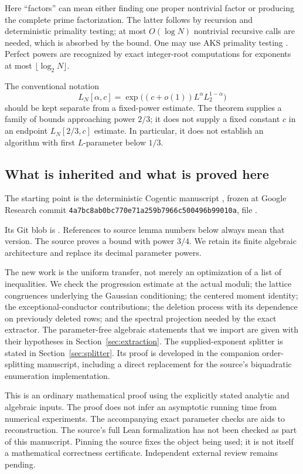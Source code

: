 Here ``factors'' can mean either finding one proper nontrivial factor or
producing the complete prime factorization.  The latter follows by
recursion and deterministic primality testing; at most \(O(\log N)\)
nontrivial recursive calls are needed, which is absorbed by the bound.
One may use AKS primality testing \cite{AKS2004}.  Perfect powers are
recognized by exact integer-root computations for exponents at most
\(\lfloor\log_2N\rfloor\).

The conventional notation
\[
 L_N[\alpha,c]=
 \exp\bigl((c+o(1))L^\alpha L_2^{1-\alpha}\bigr)
\]
should be kept separate from a fixed-power estimate.  The theorem supplies
a family of bounds approaching power \(2/3\); it does not supply a fixed
constant \(c\) in an endpoint \(L_N[2/3,c]\) estimate.  In particular, it
does not establish an algorithm with first \(L\)-parameter below \(1/3\).

\subsection{What is inherited and what is proved here}

The starting point is the deterministic Cogentic manuscript
\cite{CogDet2026}, frozen at Google Research commit
\texttt{4a7bc8ab0bc770e71a259b7966c500496b99010a}, file
.

Its Git blob is
.
References to source lemma numbers below always mean that version.
The source proves a bound with power \(3/4\).  We retain its finite
algebraic architecture and replace its decimal parameter powers.

The new work is the uniform transfer, not merely an optimization of a
list of inequalities.  We check the progression estimate at the actual
moduli; the lattice congruences underlying the Gaussian conditioning;
the centered moment identity; the exceptional-conductor contributions;
the deletion process with its dependence on previously deleted rows;
and the spectral projection needed by the exact extractor.  The
parameter-free algebraic statements that we import are given with their
hypotheses in Section~\ref{sec:extraction}.  The supplied-exponent splitter
is stated in Section~\ref{sec:splitter}.  Its proof is developed in the
companion order-splitting manuscript, including a direct replacement for
the source's biquadratic enumeration implementation.

\begin{remark}
This is an ordinary mathematical proof using the explicitly stated
analytic and algebraic inputs.  The proof does not infer an asymptotic
running time from numerical experiments.  The accompanying exact
parameter checks are aids to reconstruction.  The source's full Lean
formalization has not been checked as part of this manuscript.  Pinning
the source fixes the object being used; it is not itself a mathematical
correctness certificate.
Independent external review remains pending.
\end{remark}

